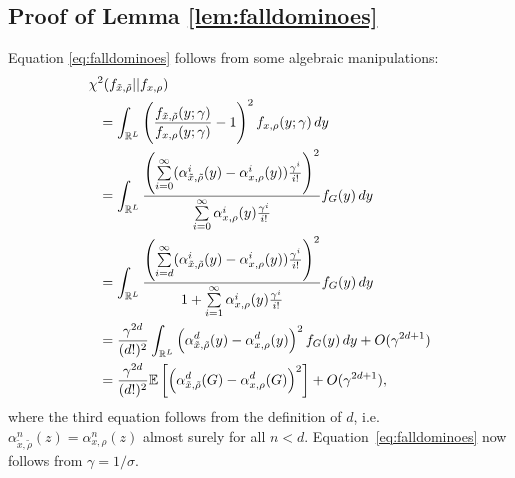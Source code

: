 \documentclass{IEEEtran}
\numberwithin{equation}{section}
\numberwithin{figure}{section}
\theoremstyle{plain}
\theoremstyle{definition}
\theoremstyle{remark}
\theoremstyle{plain}
\theoremstyle{remark}
\theoremstyle{plain}
\theoremstyle{plain}
\theoremstyle{remark}
\newcommand{\reals}{\mathbb{R}}
\newcommand{\E}{\mathbb{E}}
\newcommand{\OO}{{O}}
\begin{document}
\subsection{Proof of Lemma \ref{lem:falldominoes}}
\label{proof:falldominoes}
Equation \eqref{eq:falldominoes} follows from some algebraic manipulations:
\begin{align*}
\chi^2(f_{\tilde x,\tilde \rho}||f_{x,\rho})\hspace{-50pt} &\\
&=\int_{\reals^L} \left(\frac{f_{\tilde x,\tilde \rho}(y;\gamma)}{f_{x,\rho}(y;\gamma)}-1\right)^2 f_{x,\rho}(y;\gamma)\,dy\\
&=\int_{\reals^L} \frac{\left(\sum\limits_{i=0}^\infty (\alpha^i_{\tilde x,\tilde \rho}(y)-\alpha^i_{x,\rho}(y))\frac{\gamma^i}{i!}\right)^2}
{\sum\limits_{i=0}^\infty \alpha^i_{x,\rho}(y)\frac{\gamma^i}{i!}} f_G(y)\,dy\\
&=\int_{\reals^L} \frac{\left(\sum\limits_{i=d}^\infty (\alpha^i_{\tilde x,\tilde \rho}(y)-\alpha^i_{x,\rho}(y))\frac{\gamma^{i}}{i!}\right)^2}{1+\sum\limits_{i=1}^\infty \alpha^i_{x,\rho}(y)\frac{\gamma^i}{i!}} f_G(y)\,dy\\
&=\frac{\gamma^{2d}}{(d!)^2}\int_{\reals^L} \left(\alpha^d_{\tilde x,\tilde \rho}(y)-\alpha^d_{x,\rho}(y)\right)^2 f_G(y)\,dy+\OO(\gamma^{2d+1})\\
&=\frac{\gamma^{2d}}{(d!)^2} \E\left[\left(\alpha_{\tilde x,\tilde \rho}^d(G)-\alpha_{x,\rho}^d(G)\right)^2\right]+\OO(\gamma^{2d+1}),
\end{align*}
where the third equation follows from the definition of $d$, i.e. $\alpha_{\tilde x,\tilde \rho}^n(z)=\alpha_{x,\rho}^n(z)$ almost surely for all $n< d$. Equation~\eqref{eq:falldominoes} now follows from $\gamma=1/\sigma$.
\end{document}
